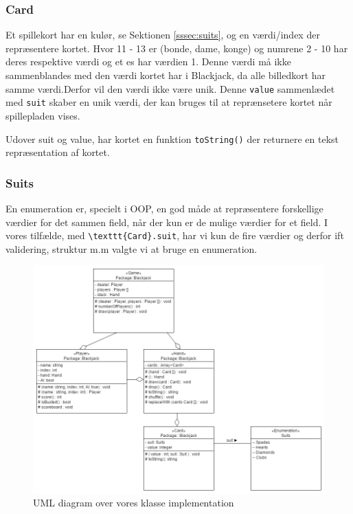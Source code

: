 \documentclass[a4paper]{article}
\begin{document}
      \subsubsection*{Card}
      Et spillekort har en kulør, se Sektionen \ref{sssec:suits}, og en værdi/index der repræsentere kortet.
      Hvor 11 - 13 er (bonde, dame, konge) og numrene 2 - 10 har deres respektive værdi og et es har værdien 1.
      Denne værdi må ikke sammenblandes med den værdi kortet har i Blackjack,
      da alle billedkort har samme værdi.Derfor vil den værdi ikke være unik.
      Denne \lstinline$value$ sammenlædet med \lstinline$suit$ skaber en unik værdi,
      der kan bruges til at reprænsetere kortet når spillepladen vises.

      Udover suit og value, har kortet en funktion \lstinline$toString()$ der returnere en tekst repræsentation af kortet.
      

      \subsubsection*{Suits} \label{sssec:suits}
      En enumeration er, specielt i OOP, en god måde at repræsentere forskellige værdier for det sammen field, 
      når der kun er de mulige værdier for et field. I vores tilfælde, med \lstinline$\texttt{Card}.suit$,
      har vi kun de fire værdier og derfor ift validering, struktur m.m valgte vi at bruge en enumeration.

      \begin{figure}[H]
        \centering

        \includegraphics[width=520px]{figures/uml.png}

        \caption{UML diagram over vores klasse implementation}
        \label{fig:umlDiagram}
      \end{figure}
\end{document}
